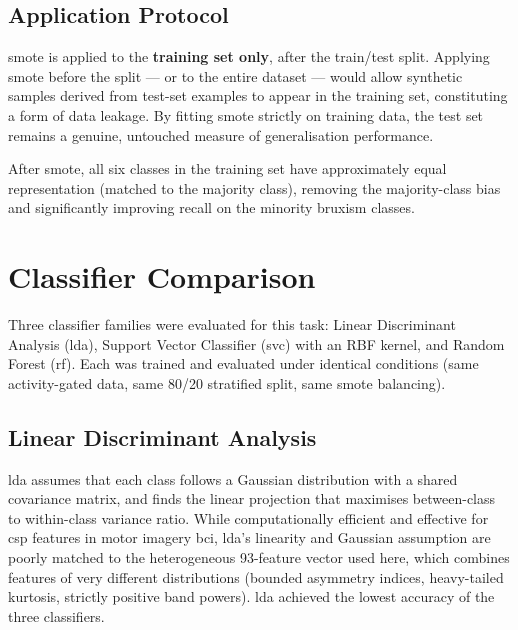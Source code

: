 \subsection{Application Protocol}

\acrshort{smote} is applied to the \textbf{training set only},
after the train/test split. Applying \acrshort{smote} before the
split — or to the entire dataset — would allow synthetic samples
derived from test-set examples to appear in the training set,
constituting a form of data leakage. By fitting \acrshort{smote}
strictly on training data, the test set remains a genuine,
untouched measure of generalisation performance.

After \acrshort{smote}, all six classes in the training set have
approximately equal representation (matched to the majority class),
removing the majority-class bias and significantly improving recall
on the minority bruxism classes.

\section{Classifier Comparison}
\label{sec:cl_classifiers}

Three classifier families were evaluated for this task: Linear
Discriminant Analysis (\acrshort{lda}), Support Vector Classifier
(\acrshort{svc}) with an RBF kernel, and Random Forest
(\acrshort{rf}). Each was trained and evaluated under identical
conditions (same activity-gated data, same 80/20 stratified split,
same \acrshort{smote} balancing).

\subsection{Linear Discriminant Analysis}

\acrshort{lda} assumes that each class follows a Gaussian
distribution with a shared covariance matrix, and finds the linear
projection that maximises between-class to within-class variance
ratio. While computationally efficient and effective for
\acrshort{csp} features in motor imagery \acrshort{bci},
\acrshort{lda}'s linearity and Gaussian assumption are poorly
matched to the heterogeneous 93-feature vector used here, which
combines features of very different distributions (bounded
asymmetry indices, heavy-tailed kurtosis, strictly positive band
powers). \acrshort{lda} achieved the lowest accuracy of the three
classifiers.

